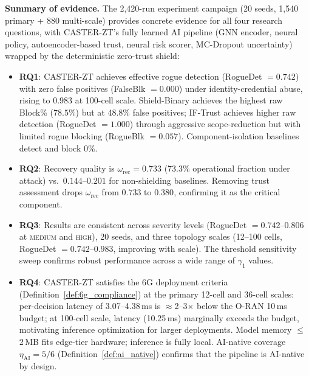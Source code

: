 \documentclass[10pt,journal,compsoc]{IEEEtran}
\begin{document}
\noindent\textbf{Summary of evidence.}
The 2,420-run experiment campaign (20 seeds, 1,540 primary + 880 multi-scale) provides concrete evidence for all four research questions, with CASTER-ZT's fully learned AI pipeline (GNN encoder, neural policy, autoencoder-based trust, neural risk scorer, MC-Dropout uncertainty) wrapped by the deterministic zero-trust shield:
\begin{itemize}
    \item \textbf{RQ1}: CASTER-ZT achieves effective rogue detection (RogueDet $= 0.742$) with zero false positives (FalseBlk $= 0.000$) under identity-credential abuse, rising to $0.983$ at 100-cell scale.  Shield-Binary achieves the highest raw Block\% ($78.5\%$) but at 48.8\% false positives; IF-Trust achieves higher raw detection (RogueDet $= 1.000$) through aggressive scope-reduction but with limited rogue blocking (RogueBlk $= 0.057$).  Component-isolation baselines detect and block 0\%.
    \item \textbf{RQ2}: Recovery quality is $\omega_{\mathrm{rec}} = 0.733$ (73.3\% operational fraction under attack) vs.\ $0.144$--$0.201$ for non-shielding baselines.  Removing trust assessment drops $\omega_{\mathrm{rec}}$ from $0.733$ to $0.380$, confirming it as the critical component.
    \item \textbf{RQ3}: Results are consistent across severity levels (RogueDet $= 0.742$--$0.806$ at \textsc{medium} and \textsc{high}), 20 seeds, and three topology scales (12--100 cells, RogueDet $= 0.742$--$0.983$, improving with scale).  The threshold sensitivity sweep confirms robust performance across a wide range of $\gamma_1$ values.
    \item \textbf{RQ4}: CASTER-ZT satisfies the 6G deployment criteria (Definition~\ref{def:6g_compliance}) at the primary 12-cell and 36-cell scales: per-decision latency of 3.07--4.38\,ms is $\approx$2--3$\times$ below the O-RAN 10\,ms budget; at 100-cell scale, latency (10.25\,ms) marginally exceeds the budget, motivating inference optimization for larger deployments.  Model memory $\le$2\,MB fits edge-tier hardware; inference is fully local.  AI-native coverage $\eta_{\mathrm{AI}} = 5/6$ (Definition~\ref{def:ai_native}) confirms that the pipeline is AI-native by design.
\end{itemize}
\end{document}
